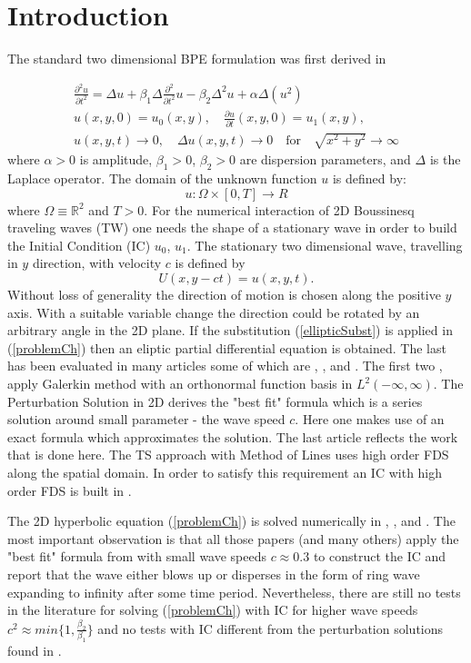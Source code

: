 \documentclass[%
 aip,
cp,  %
 amsmath,amssymb,%
 reprint,%
]{revtex4-2}
\newcommand{\be}{\begin{equation}}
\newcommand{\ee}{\end{equation}}
\newcommand{\rf}[1]{(\ref{#1})}
\newcommand{\RR}{\mathbb{R}}
\begin{document}
\section{\label{sec:level1}Introduction}

The standard two dimensional BPE formulation was first derived in \cite{ref1}

\begin{align}\label{problemCh}
 \frac{\partial^2 u}{\partial t^2}= \Delta u + \beta_1 \Delta \frac{\partial^2}{\partial t^2} u -  \beta_2 \Delta^2 u +  \alpha \Delta (u^2)
\\
u(x,y,0) = u_0(x,y), \quad \frac{\partial u}{\partial t}(x,y,0)=u_1(x,y), \nonumber
\\
u(x,y,t) \rightarrow 0, \quad \Delta u(x,y, t) \rightarrow 0 \quad \text{for} \quad \sqrt{x^2+y^2} \rightarrow \infty \nonumber
\end{align}
where $\alpha>0$ is amplitude, $\beta_1>0$, $\beta_2>0$  are dispersion parameters, and $\Delta$ is the Laplace operator. The domain of the unknown function $u$ is defined by:
\be
 u:\Omega \times [0, T] \rightarrow R
\ee
where $\Omega \equiv \RR^2$ and $T>0$. For the numerical interaction of 2D Boussinesq traveling waves (TW) one needs the shape of a stationary wave in order to build the Initial Condition (IC) $u_0$, $u_1$. The stationary two dimensional wave, travelling in $y$ direction, with velocity $c$ is defined by
\be\label{ellipticSubst}
	U(x, y-ct) = u(x,y,t).
\ee
Without loss of generality the direction of motion is chosen along the positive $y$ axis. With a suitable variable change the direction could be rotated by an arbitrary angle in the 2D plane. If the substitution \rf{ellipticSubst} is applied in \rf{problemCh} then an eliptic partial differential equation is obtained. The last has been evaluated in many articles some of which are \cite{ref13}, \cite{ref14}, \cite{ref15} and \cite{ref16}. The first two \cite{ref13}, \cite{ref14} apply Galerkin method with an orthonormal function basis in $L^2(-\infty, \infty)$. The Perturbation Solution \cite{ref15} in 2D derives the "best fit" formula which is a series solution around small parameter - the wave speed $c$. Here one makes use of an exact formula which approximates the solution. The last article \cite{ref16} reflects the work that is done here. The TS approach with Method of Lines uses high order FDS along the spatial domain. In order to satisfy this requirement an IC with high order FDS is built in \cite{ref16}.

The 2D hyperbolic equation \rf{problemCh} is solved numerically in \cite{ref20}, \cite{ref21}, \cite{ref22} and \cite{ref23}. The most important observation is that all those papers (and many others) apply the "best fit" formula from \cite{ref15} with small wave speeds $c \approx 0.3$ to construct the IC and report that the wave either blows up or disperses in the form of ring wave expanding to infinity after some time period. Nevertheless, there are still no tests in the literature for solving \rf{problemCh} with IC for higher wave speeds $c^2 \approx min\{1, \frac{\beta_2}{\beta_1} \}$ and no tests with IC different from the perturbation solutions found in \cite{ref15}.
\end{document}
